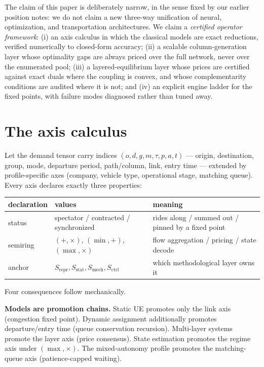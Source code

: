 \documentclass[11pt]{article}
\begin{document}
The claim of this paper is deliberately narrow, in the sense fixed by
our earlier position notes: we do not claim a new three-way unification
of neural, optimization, and transportation architectures. We claim a
\emph{certified operator framework}: (i) an axis calculus in which the
classical models are exact reductions, verified numerically to
closed-form accuracy; (ii) a scalable column-generation layer whose
optimality gaps are always priced over the full network, never over the
enumerated pool; (iii) a layered-equilibrium layer whose prices are
certified against exact duals where the coupling is convex, and whose
complementarity conditions are audited where it is not; and (iv) an
explicit engine ladder for the fixed points, with failure modes
diagnosed rather than tuned away.

\section{The axis calculus}

Let the demand tensor carry indices
$(o,d,g,m,\tau,p,a,t)$ --- origin, destination, group, mode, departure
period, path/column, link, entry time --- extended by profile-specific
axes (company, vehicle type, operational stage, matching queue). Every
axis declares exactly three properties:

\begin{center}
\begin{tabular}{@{}lll@{}}
\toprule
declaration & values & meaning \\
\midrule
status & spectator / contracted / synchronized &
rides along / summed out / pinned by a fixed point \\
semiring & $(+,\times)$, $(\min,+)$, $(\max,\times)$ &
flow aggregation / pricing / state decode \\
anchor & $S_{\mathrm{repr}}, S_{\mathrm{stat}}, S_{\mathrm{mech}},
S_{\mathrm{ctrl}}$ & which methodological layer owns it \\
\bottomrule
\end{tabular}
\end{center}

\noindent Four consequences follow mechanically.

\textbf{Models are promotion chains.} Static UE promotes only the link
axis (congestion fixed point). Dynamic assignment additionally promotes
departure/entry time (queue conservation recursion). Multi-layer
systems promote the layer axis (price consensus). State estimation
promotes the regime axis under $(\max,\times)$. The mixed-autonomy
profile promotes the matching-queue axis (patience-capped waiting).
\end{document}
